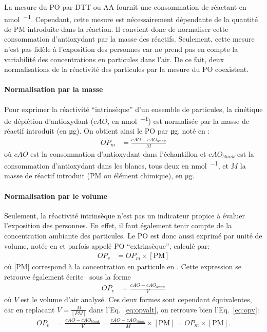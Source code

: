 La mesure du PO par DTT ou AA fournit une consommation de réactant en \si{\nmol\per\min}.
Cependant, cette mesure est nécessairement dépendante de la quantité de PM introduite dans
la réaction.
Il convient donc de normaliser cette consommation d'antioxydant par la masse des réactifs.
Seulement, cette mesure n'est pas fidèle à l'exposition des personnes car ne prend pas en
compte la variabilité des concentrations en particules dans l'air. De ce fait, deux normalisations de la réactivité des
particules par la mesure du PO coexistent.

\paragraph{Normalisation par la masse}%
\label{par:normalisation_par_la_masse}
Pour exprimer la réactivité ``intrinsèque'' d'un ensemble de particules, la cinétique de déplétion
d'antioxydant ($cAO$, en \si{\nmol\per\min}) est normalisée par la masse de réactif
introduit (en \si{\ug}). On obtient ainsi le PO par \si{\ug}, noté \OPm{} en
\si{\opm}:
\begin{align}
    \label{eq:opm}
    OP_m &= \frac{cAO - cAO_{blank}}{M}
\end{align}
où $cAO$ est la consommation d'antioxydant dans l'échantillon et $cAO_{blank}$
est la consommation d'antioxydant dans les blancs, tous deux en \si{\nmol\per\min}, et $M$
la masse de réactif introduit (PM ou élément chimique), en \si{\ug}.

\paragraph{Normalisation par le volume}%
\label{par:normalisation_par_le_volume}

Seulement, la réactivité intrinsèque n'est pas un indicateur propice à évaluer
l'exposition des personnes. En
effet, il faut également tenir compte de la concentration ambiante des particules. Le PO
est donc aussi exprimé par unité de volume, notée \OPv{} en \si{\opv} et parfois appelé PO
``extrinsèque'', calculé par:
\begin{align}
    \label{eq:opv}
    OP_v &= OP_m \times [\text{PM}]
\end{align}
où [PM] correspond à la concentration en particule en \si{\ugm}. Cette expression se
retrouve également écrite~\autocite{fangSemiautomated2015} sous la forme
\begin{align}
    \label{eq:opvalt}
    OP_v &= \frac{cAO - cAO_{blank}}{V}
\end{align}
où $V$ est le volume d'air analysé. Ces deux formes sont cependant équivalentes, car en
replacant $V = \frac{M}{[PM]}$ dans l'Eq.~\ref{eq:opvalt}, on retrouve bien
l'Eq.~\ref{eq:opv}:
\begin{align}
    \label{eq:opvopvalt}
    OP_v &= \frac{cAO -cAO_{blank}}{V} = \frac{cAO -cAO_{blank}}{M}\times [\text{PM}] = OP_m \times [\text{PM}].
\end{align}

